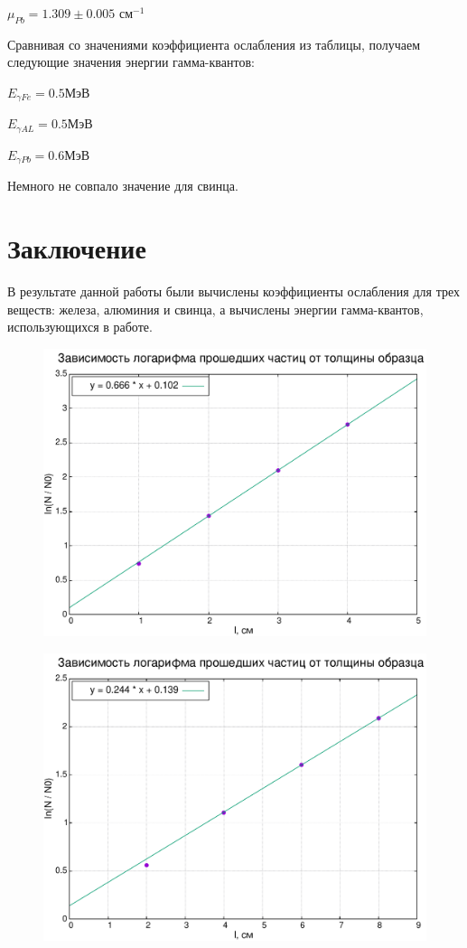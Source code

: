 \documentclass[%
reprint,
amsmath,amssymb,
aps,
]{revtex4-2}
\begin{document}
	 
	  $\mu_{Pb} = 1.309 \pm 0.005 \text{ см}^{-1}$
	  
	  
	Сравнивая со значениями коэффициента ослабления из таблицы, получаем следующие значения энергии гамма-квантов:
	
	 $E_{\gamma Fe} = 0.5\text{МэВ}$
	
	$E_{\gamma AL} = 0.5\text{МэВ}$
	
	$E_{\gamma Pb} = 0.6\text{МэВ}$
	
	Немного не совпало значение для свинца.
	  
	  
	
	
	
	\section{Заключение}
	
	В результате данной работы были вычислены коэффициенты ослабления для трех веществ: железа, алюминия и свинца, а вычислены энергии гамма-квантов, использующихся в работе.
	
	
	\begin{figure}[]
		\includegraphics[width=\linewidth]{ratio-length-fe.pdf}
	\end{figure}
	
	\begin{figure}[]
		\includegraphics[width=\linewidth]{ratio-length-al.pdf}
	\end{figure}
	
\end{document}
